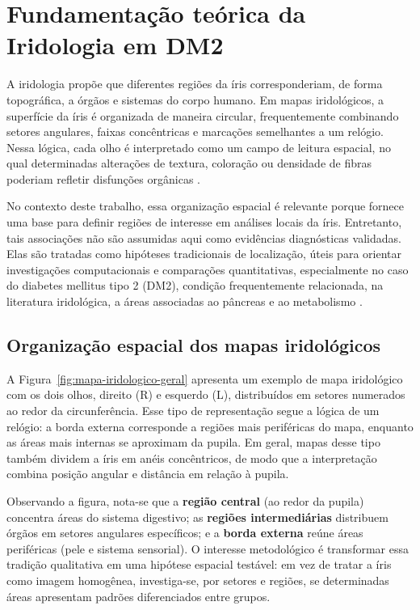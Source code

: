 \documentclass[11pt,a4paper]{article}
\begin{document}
\section{Fundamentação teórica da Iridologia em DM2}

A iridologia propõe que diferentes regiões da íris corresponderiam, de forma topográfica, a órgãos e sistemas do corpo humano. Em mapas iridológicos, a superfície da íris é organizada de maneira circular, frequentemente combinando setores angulares, faixas concêntricas e marcações semelhantes a um relógio. Nessa lógica, cada olho é interpretado como um campo de leitura espacial, no qual determinadas alterações de textura, coloração ou densidade de fibras poderiam refletir disfunções orgânicas \citep{Jensen1982, Deck1981}.

No contexto deste trabalho, essa organização espacial é relevante porque fornece uma base para definir regiões de interesse em análises locais da íris. Entretanto, tais associações não são assumidas aqui como evidências diagnósticas validadas. Elas são tratadas como hipóteses tradicionais de localização, úteis para orientar investigações computacionais e comparações quantitativas, especialmente no caso do diabetes mellitus tipo 2 (DM2), condição frequentemente relacionada, na literatura iridológica, a áreas associadas ao pâncreas e ao metabolismo \citep{Ernst2000ArchOphthalmol, Simon1979JAMA, Knipschild1988BMJ}.

\subsection{Organização espacial dos mapas iridológicos}

A Figura~\ref{fig:mapa-iridologico-geral} apresenta um exemplo de mapa iridológico com os dois olhos, direito (R) e esquerdo (L), distribuídos em setores numerados ao redor da circunferência. Esse tipo de representação segue a lógica de um relógio: a borda externa corresponde a regiões mais periféricas do mapa, enquanto as áreas mais internas se aproximam da pupila. Em geral, mapas desse tipo também dividem a íris em anéis concêntricos, de modo que a interpretação combina posição angular e distância em relação à pupila.

Observando a figura, nota-se que a \textbf{região central} (ao redor da pupila) concentra áreas do sistema digestivo; as \textbf{regiões intermediárias} distribuem órgãos em setores angulares específicos; e a \textbf{borda externa} reúne áreas periféricas (pele e sistema sensorial). O interesse metodológico é transformar essa tradição qualitativa em uma hipótese espacial testável: em vez de tratar a íris como imagem homogênea, investiga-se, por setores e regiões, se determinadas áreas apresentam padrões diferenciados entre grupos.
\end{document}
